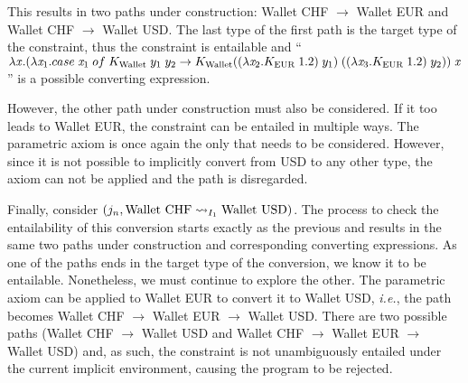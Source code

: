 This results in two paths under construction: Wallet CHF $\to$ Wallet EUR and Wallet CHF $\to$ Wallet USD. The last type of the first path is the target type of the constraint, thus the constraint is entailable and ``$\lambda \tmVar . (\lambda \tmVar_1. case\;\tmVar_1\; of\;K_{\text{Wallet}}\;y_1\;y_2 \to \\ K_{\text{Wallet}} ((\lambda \tmVar_2 . K_{\text{EUR}}\; 1.2)\;y_1)\;((\lambda \tmVar_3 . K_{\text{EUR}}\; 1.2)\;y_2))\;\tmVar$'' is a possible converting expression.

However, the other path under construction must also be considered. If it too leads to Wallet EUR, the constraint can be entailed in multiple ways. The parametric axiom is once again the only that needs to be considered. However, since it is not possible to implicitly convert from USD to any other type, the axiom can not be applied and the path is disregarded.

Finally, consider $(j_n,\convX{\imEnv_1}{\text{Wallet CHF}}{\text{Wallet USD}})$. The process to check the entailability of this conversion starts exactly as the previous and results in the same two paths under construction and corresponding converting expressions. As one of the paths ends in the target type of the conversion, we know it to be entailable. Nonetheless, we must continue to explore the other. The parametric axiom can be applied to Wallet EUR to convert it to Wallet USD, \textit{i.e.}, the path becomes Wallet CHF $\to$ Wallet EUR $\to$ Wallet USD. There are two possible paths (Wallet CHF $\to$ Wallet USD and Wallet CHF $\to$ Wallet EUR $\to$ Wallet USD) and, as such, the constraint is not unambiguously entailed under the current implicit environment, causing the program to be rejected.
